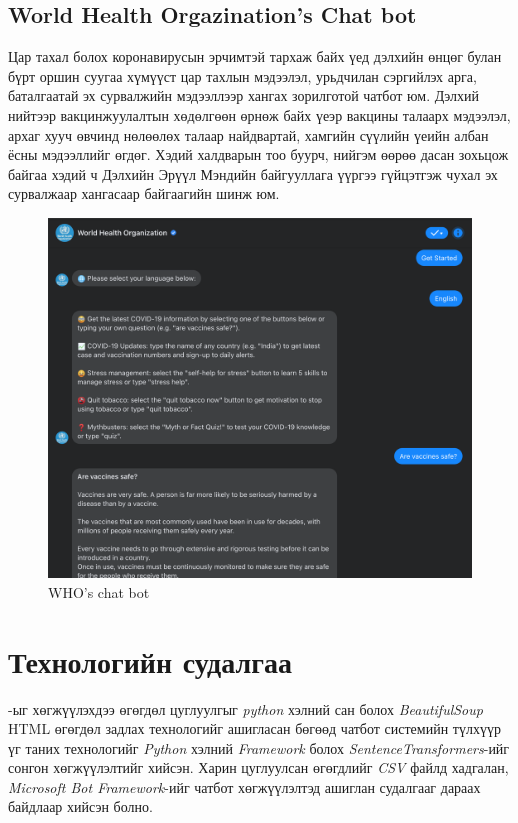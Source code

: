 \subsection{World Health Orgazination's Chat bot}
Цар тахал болох коронавирусын эрчимтэй тархаж байх үед дэлхийн өнцөг булан бүрт оршин суугаа хүмүүст цар тахлын мэдээлэл, урьдчилан сэргийлэх арга, баталгаатай эх сурвалжийн мэдээллээр хангах зорилготой чатбот юм.
Дэлхий нийтээр вакцинжуулалтын хөдөлгөөн өрнөж байх үеэр вакцины талаарх мэдээлэл, архаг хууч өвчинд нөлөөлөх талаар найдвартай, хамгийн сүүлийн үеийн албан ёсны мэдээллийг өгдөг. Хэдий халдварын тоо буурч, нийгэм өөрөө дасан зохьцож байгаа хэдий ч Дэлхийн Эрүүл Мэндийн байгууллага үүргээ гүйцэтгэж чухал эх сурвалжаар хангасаар байгаагийн шинж юм. 
\begin{figure}[h]
  \centering
  \includegraphics[width=\textwidth-4cm]{images/whoBOT.png}
  \caption{WHO's chat bot}
\end{figure}
\section{Технологийн судалгаа}
\@title-ыг хөгжүүлэхдээ өгөгдөл цуглуулгыг \textit{python} хэлний сан болох \textit{BeautifulSoup} HTML өгөгдөл задлах технологийг ашигласан бөгөөд чатбот системийн түлхүүр үг таних технологийг \textit{Python} хэлний \textit{Framework} болох \textit{SentenceTransformers}-ийг сонгон хөгжүүлэлтийг хийсэн. Харин цуглуулсан өгөгдлийг \textit{CSV} файлд хадгалан, \textit{Microsoft Bot Framework}-ийг чатбот хөгжүүлэлтэд ашиглан судалгааг дараах байдлаар хийсэн болно. 
